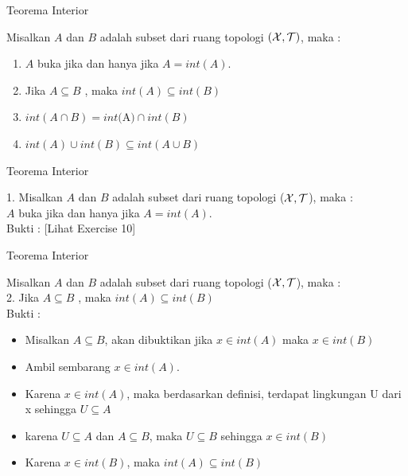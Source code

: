 \begin{frame}{Teorema Interior}
    \begin{tcolorbox}[enhanced,title=Teorema 1.24, frame style tile={width=\paperwidth}{\wallpaper}]
        Misalkan $A$ dan $B$ adalah subset dari ruang topologi $(\mathcal{X}, \mathcal{T})$, maka : 
        \begin{enumerate}
        \item $A$ buka jika dan hanya jika $A = int(A)$.
        \item Jika $A \subseteq B$ , maka $int(A) \subseteq int(B)$
        \item $int(A \cap B) = int($A$) \cap int(B)$
        \item $int(A) \cup int(B) \subseteq int(A \cup B)$
        \end{enumerate}
    \end{tcolorbox}
\end{frame}

\begin{frame}{Teorema Interior}
    \begin{tcolorbox}[enhanced,title=Teorema 1.24, frame style tile={width=\paperwidth}{\wallpaper}]
        1. Misalkan $A$ dan $B$ adalah subset dari ruang topologi ($\mathcal{X}, \mathcal{T}$), maka : \\
        $A$ buka jika dan hanya jika $A = int(A)$. \\

        Bukti : [Lihat Exercise 10]
        
    \end{tcolorbox}
\end{frame}

\begin{frame}{Teorema Interior}
    \begin{tcolorbox}[enhanced,title=Teorema 1.24, frame style tile={width=\paperwidth}{\wallpaper}]
        Misalkan $A$ dan $B$ adalah subset dari ruang topologi ($\mathcal{X}, \mathcal{T}$), maka : \\
        2. Jika $A \subseteq B$ , maka $int(A) \subseteq int(B)$ \\
        Bukti :
        \begin{itemize}
            \item Misalkan $A \subseteq B$, akan dibuktikan jika $x \in int(A)$ maka $x \in int (B)$
            \item Ambil sembarang $x \in int(A)$.
            \item Karena $x \in int(A)$, maka berdasarkan definisi, terdapat lingkungan U dari x sehingga $U \subseteq A$
            \item karena $U \subseteq A $ dan $A \subseteq B$, maka $U \subseteq B$ sehingga $x \in int (B)$
            \item Karena $x \in int (B)$, maka $int(A) \subseteq int(B)$
        \end{itemize}
    \end{tcolorbox}
\end{frame}

